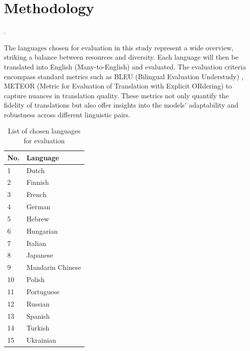 \documentclass[a4paper]{article}
\begin{document}
\section{Methodology}.

The languages chosen for evaluation in this study represent a wide overview, striking a balance between resources and diversity. Each language will then be translated into English (Many-to-English) and evaluated. The evaluation criteria encompass standard metrics such as BLEU (Bilingual Evaluation Understudy) \cite{papieni-2002-bleu}, METEOR (Metric for Evaluation of Translation with Explicit ORdering) \cite{lavie-2007-meteor} to capture nuances in translation quality. These metrics not only quantify the fidelity of translations but also offer insights into the models' adaptability and robustness across different linguistic pairs.

\begin{table}[htbp]
    \centering
    \begin{tabular}{|l|l|}
        \hline
        \textbf{No.} & \textbf{Language} \\
        \hline
        1            & Dutch             \\
        2            & Finnish           \\
        3            & French            \\
        4            & German            \\
        5            & Hebrew            \\
        6            & Hungarian         \\
        7            & Italian           \\
        8            & Japanese          \\
        9            & Mandarin Chinese  \\
        10           & Polish            \\
        11           & Portuguese        \\
        12           & Russian           \\
        13           & Spanish           \\
        14           & Turkish           \\
        15           & Ukrainian         \\
        \hline
    \end{tabular}
    \caption{List of chosen languages for evaluation}
\end{table}
\end{document}
